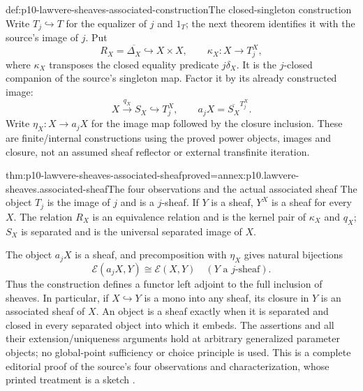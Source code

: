 \begin{hbdefinition}{def:p10-lawvere-sheaves-associated-construction}{The closed-singleton construction}
Write \(T_j\hookrightarrow T\) for the equalizer of \(j\)
and \(1_T\); the next theorem identifies it with the source's
image of \(j\).  Put
\[
 R_X=\overline{\Delta_X}\hookrightarrow X\times X,
 \qquad \kappa_X:X\longrightarrow T_j^X,
\]
where \(\kappa_X\) transposes the closed equality predicate
\(j\delta_X\).  It is the \(j\)-closed companion of the
source's singleton map.  Factor it by its already constructed image:
\[
 X\xrightarrow{q_X}S_X\hookrightarrow T_j^X,
 \qquad a_jX=\overline{S_X}^{T_j^X}.
\]
Write \(\eta_X:X\to a_jX\) for the image map followed by
the closure inclusion.  These are finite/internal constructions
using the proved power objects, images and closure, not an
assumed sheaf reflector or external transfinite iteration.
\end{hbdefinition}

\begin{hbtheorem}{thm:p10-lawvere-sheaves-associated-sheaf}{proved=annex:p10.lawvere-sheaves.associated-sheaf}{The four observations and the actual associated sheaf}
The object \(T_j\) is the image of \(j\) and is a
\(j\)-sheaf.  If \(Y\) is a sheaf, \(Y^X\) is a
sheaf for every \(X\).  The relation \(R_X\) is an
equivalence relation and is the kernel pair of \(\kappa_X\)
and \(q_X\); \(S_X\) is separated and is the universal
separated image of \(X\).

The object \(a_jX\) is a sheaf, and precomposition with
\(\eta_X\) gives natural bijections
\[
       \mathcal E(a_jX,Y)\cong\mathcal E(X,Y)
                           \quad(Y\text{ a }j\text{-sheaf}).
\]
Thus the construction defines a functor left adjoint to the
full inclusion of sheaves.  In particular, if
\(X\hookrightarrow Y\) is a mono into any sheaf, its
closure in \(Y\) is an associated sheaf of \(X\).
An object is a sheaf exactly when it is separated and closed
in every separated object into which it embeds.  The assertions
and all their extension/uniqueness arguments hold at arbitrary
generalized parameter objects; no global-point sufficiency or
choice principle is used.  This is a complete editorial proof
of the source's four observations and characterization, whose
printed treatment is a sketch \cite[p.~331]{Lawvere1970}.
\end{hbtheorem}

